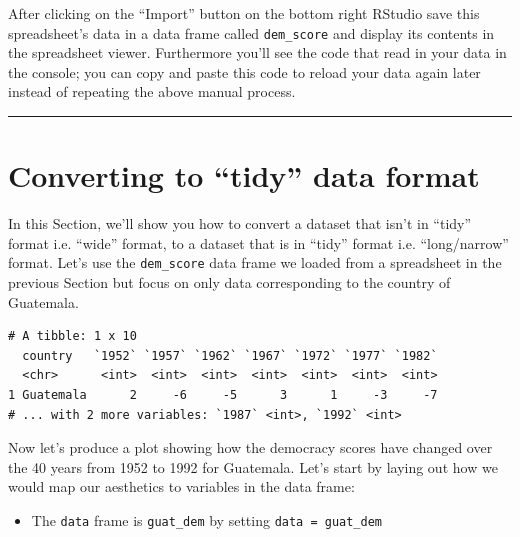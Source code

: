 \documentclass[12pt,]{krantz}
\makeatletter
\newenvironment{Shaded}{\begin{snugshade}}{\end{snugshade}}
\newcommand{\KeywordTok}[1]{\textcolor[rgb]{0.27,0.27,0.27}{\textbf{#1}}}
\newcommand{\StringTok}[1]{\textcolor[rgb]{0.5,0.5,0.5}{#1}}
\newcommand{\OperatorTok}[1]{\textcolor[rgb]{0.43,0.43,0.43}{\textbf{#1}}}
\newcommand{\NormalTok}[1]{#1}
\providecommand{\tightlist}{%
  \setlength{\itemsep}{0pt}\setlength{\parskip}{0pt}}
\newenvironment{kframe}{%
\medskip{}
\setlength{\fboxsep}{.8em}
 \def\at@end@of@kframe{}%
 \ifinner\ifhmode%
  \def\at@end@of@kframe{\end{minipage}}%
  \begin{minipage}{\columnwidth}%
 \fi\fi%
 \def\FrameCommand##1{\hskip\@totalleftmargin \hskip-\fboxsep
 \colorbox{shadecolor}{##1}\hskip-\fboxsep
     \hskip-\linewidth \hskip-\@totalleftmargin \hskip\columnwidth}%
 \MakeFramed {\advance\hsize-\width
   \@totalleftmargin\z@ \linewidth\hsize
   \@setminipage}}%
 {\par\unskip\endMakeFramed%
 \at@end@of@kframe}
\renewenvironment{Shaded}{\begin{kframe}}{\end{kframe}}
\makeatother
\begin{document}
After clicking on the ``Import'' button on the bottom right RStudio save
this spreadsheet's data in a data frame called \texttt{dem\_score} and
display its contents in the spreadsheet viewer. Furthermore you'll see
the code that read in your data in the console; you can copy and paste
this code to reload your data again later instead of repeating the above
manual process.

\begin{center}\rule{0.5\linewidth}{\linethickness}\end{center}

\section{\texorpdfstring{Converting to ``tidy'' data
format}{Converting to tidy data format}}\label{tidying}

In this Section, we'll show you how to convert a dataset that isn't in
``tidy'' format i.e. ``wide'' format, to a dataset that is in ``tidy''
format i.e. ``long/narrow'' format. Let's use the \texttt{dem\_score}
data frame we loaded from a spreadsheet in the previous Section but
focus on only data corresponding to the country of Guatemala.

\begin{Shaded}
\end{Shaded}

\begin{verbatim}
# A tibble: 1 x 10
  country   `1952` `1957` `1962` `1967` `1972` `1977` `1982`
  <chr>      <int>  <int>  <int>  <int>  <int>  <int>  <int>
1 Guatemala      2     -6     -5      3      1     -3     -7
# ... with 2 more variables: `1987` <int>, `1992` <int>
\end{verbatim}

Now let's produce a plot showing how the democracy scores have changed
over the 40 years from 1952 to 1992 for Guatemala. Let's start by laying
out how we would map our aesthetics to variables in the data frame:

\begin{itemize}
\tightlist
\item
  The \texttt{data} frame is \texttt{guat\_dem} by setting
  \texttt{data\ =\ guat\_dem}
\end{itemize}
\end{document}
